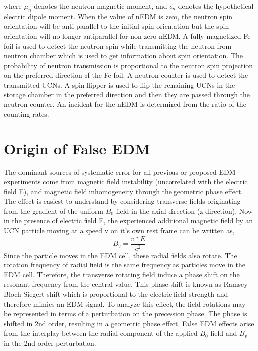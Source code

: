 where $\mu_n$ denotes the neutron magnetic moment, and $d_n$ denotes the hypothetical electric dipole moment. When the value of nEDM is zero, the neutron spin orientation will be anti-parallel to the initial spin orientation but the spin orientation will no longer antiparallel for non-zero nEDM. A fully magnetized Fe-foil is used to detect the neutron spin while transmitting the neutron from neutron chamber which is used to get information about spin orientation. The probability of neutron transmission is proportional to the neutron spin projection on the preferred direction of the Fe-foil. A neutron counter is used to detect the transmitted UCNs. A spin flipper is used to flip the remaining UCNs in the storage chamber in the preferred direction and then they are passed through the neutron counter. An incident for the nEDM is determined from the ratio of the counting rates.

\section{Origin of False EDM}
The dominant sources of systematic error for all previous or proposed EDM experiments come from magnetic field instability (uncorrelated with the electric field E), and magnetic field inhomogeneity through the geometric phase effect.  The effect is easiest to understand by considering transverse fields originating from the gradient of the uniform $B_0$  field in the axial direction (z direction).  Now in the presence of electric field E, the experienced additional magnetic field by an UCN particle moving at a speed v on it’s own rest frame can be written as,
\begin{equation}
  B_v = \frac{v*E}{c^2}
  \label{equation:phase effect}
\end{equation}
 Since the particle moves in the EDM cell, these radial fields also rotate. The rotation frequency of radial field is the same frequency as particles move in the EDM cell.  Therefore, the transverse rotating field induce a phase shift on the resonant frequency from the central value.  This phase shift is known as Ramsey-Bloch-Siegert shift which is proportional to the electric-field strength and therefore mimics an EDM signal. 
 To analyze this effect, the field rotations may be represented in terms of a perturbation on the precession phase. The phase is shifted in 2nd order, resulting in a geometric phase effect.  False EDM effects arise from the interplay between the radial component of the applied $B_0$  field and $B_v$ in the 2nd order perturbation.

